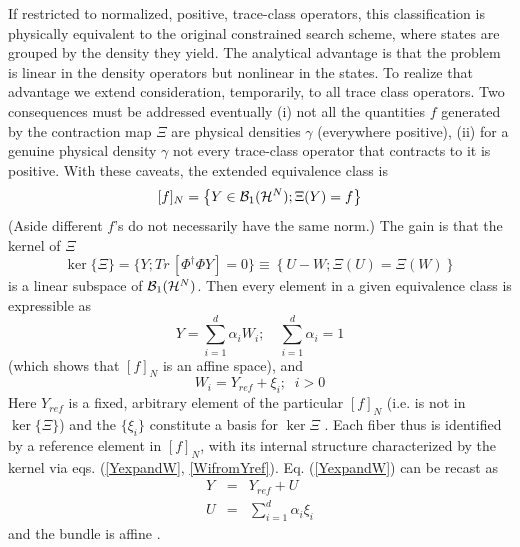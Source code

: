 If restricted to normalized, positive, trace-class operators, this
classification is physically equivalent to the original constrained search
scheme, where states are grouped by the density they yield. The analytical
advantage is that the problem is linear in the density operators but
nonlinear in the states. To realize that advantage we extend consideration,
temporarily, to all trace class operators. Two consequences must be
addressed eventually (i) not all the quantities $f$ generated by the
contraction map $\Xi $ are physical densities $\gamma $ (everywhere
positive), (ii) for a genuine physical density $\gamma $ not every
trace-class operator that contracts to it is positive. With these caveats,
the extended equivalence class is 
\begin{equation}
\lbrack f]_{N}=\left\{ Y\in {\cal B}_{1}({\cal H}^{N});\Xi (Y)=f\right\} 
\label{genequiv}
\end{equation}%
(Aside different $f$'s do not necessarily have the same norm.) The gain is
that the kernel of $\Xi $ 
\begin{equation}
\ker \{\Xi \}=\{Y;Tr\,[\Phi ^{\dagger }\Phi Y]=0\}\equiv \left\{ U-W;\Xi
\left( U\right) =\Xi \left( W\right) \right\}   \label{kerdef}
\end{equation}%
is a linear subspace of ${\cal B}_{1}({\cal H}^{N})$. Then every element in
a given equivalence class is expressible as 
\begin{equation}
Y=\sum_{i=1}^{d}\alpha _{i}W_{i};\quad \sum_{i=1}^{d}\alpha _{i}=1
\label{YexpandW}
\end{equation}%
(which shows that $[f]_{N}$ is an affine space), and 
\begin{equation}
W_{i}=Y_{ref}+\xi _{i};\;\;i>0  \label{WifromYref}
\end{equation}%
Here $Y_{ref}$ is a fixed, arbitrary element of the particular $[f]_{N}$
(i.e. is not in $\ker \{\Xi \}$) and the $\{\xi _{i}\}$ constitute a basis
for $\ker \Xi $ \cite{Yref}. Each fiber thus is identified by a reference
element in $[f]_{N}$, with its internal structure characterized by the
kernel via eqs. (\ref{YexpandW}, \ref{WifromYref}). Eq. (\ref{YexpandW}) can
be recast as 
\begin{eqnarray}
Y &=&Y_{ref}+U  \nonumber \\
U &=&\sum_{i=1}^{d}\alpha _{i}\xi _{i}  \label{YYref}
\end{eqnarray}%
and the bundle is affine \cite{diffbundle}.

